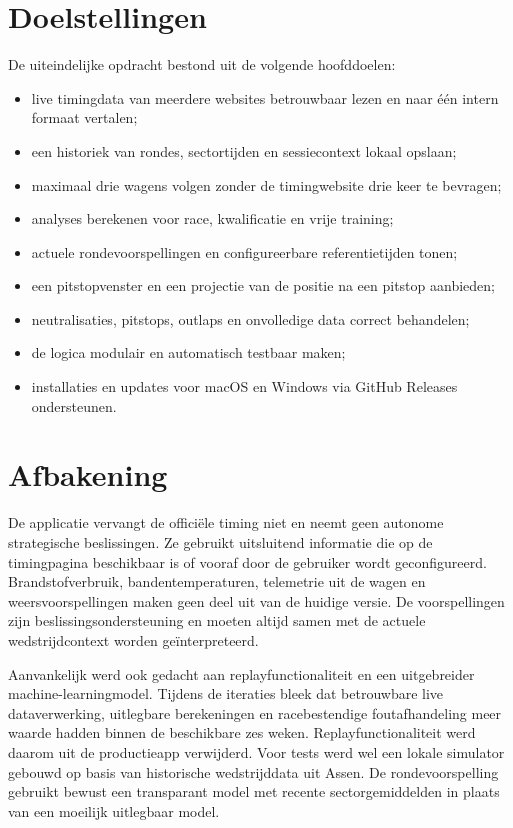 \section{Doelstellingen}
De uiteindelijke opdracht bestond uit de volgende hoofddoelen:

\begin{itemize}
  \item live timingdata van meerdere websites betrouwbaar lezen en naar één intern formaat vertalen;
  \item een historiek van rondes, sectortijden en sessiecontext lokaal opslaan;
  \item maximaal drie wagens volgen zonder de timingwebsite drie keer te bevragen;
  \item analyses berekenen voor race, kwalificatie en vrije training;
  \item actuele rondevoorspellingen en configureerbare referentietijden tonen;
  \item een pitstopvenster en een projectie van de positie na een pitstop aanbieden;
  \item neutralisaties, pitstops, outlaps en onvolledige data correct behandelen;
  \item de logica modulair en automatisch testbaar maken;
  \item installaties en updates voor macOS en Windows via GitHub Releases ondersteunen.
\end{itemize}

\section{Afbakening}
De applicatie vervangt de officiële timing niet en neemt geen autonome strategische beslissingen. Ze gebruikt uitsluitend informatie die op de timingpagina beschikbaar is of vooraf door de gebruiker wordt geconfigureerd. Brandstofverbruik, bandentemperaturen, telemetrie uit de wagen en weersvoorspellingen maken geen deel uit van de huidige versie. De voorspellingen zijn beslissingsondersteuning en moeten altijd samen met de actuele wedstrijdcontext worden geïnterpreteerd.

Aanvankelijk werd ook gedacht aan replayfunctionaliteit en een uitgebreider machine-learningmodel. Tijdens de iteraties bleek dat betrouwbare live dataverwerking, uitlegbare berekeningen en racebestendige foutafhandeling meer waarde hadden binnen de beschikbare zes weken. Replayfunctionaliteit werd daarom uit de productieapp verwijderd. Voor tests werd wel een lokale simulator gebouwd op basis van historische wedstrijddata uit Assen. De rondevoorspelling gebruikt bewust een transparant model met recente sectorgemiddelden in plaats van een moeilijk uitlegbaar model.

